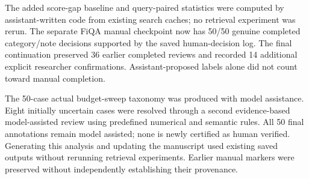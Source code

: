 \documentclass[10pt,twocolumn]{article}
\begin{document}
The added score-gap baseline and query-paired statistics were computed by assistant-written code from existing search caches; no retrieval experiment was rerun. The separate FiQA manual checkpoint now has 50/50 genuine completed category/note decisions supported by the saved human-decision log. The final continuation preserved 36 earlier completed reviews and recorded 14 additional explicit researcher confirmations. Assistant-proposed labels alone did not count toward manual completion.

The 50-case actual budget-sweep taxonomy was produced with model assistance. Eight initially uncertain cases were resolved through a second evidence-based model-assisted review using predefined numerical and semantic rules. All 50 final annotations remain model assisted; none is newly certified as human verified. Generating this analysis and updating the manuscript used existing saved outputs without rerunning retrieval experiments. Earlier manual markers were preserved without independently establishing their provenance.
\end{document}
